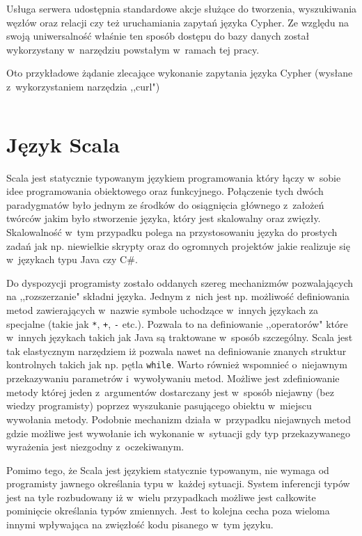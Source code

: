 \documentclass[brudnopis]{xmgr}
\begin{document}
Usługa serwera udostępnia standardowe akcje służące do tworzenia, wyszukiwania węzłów oraz relacji czy też uruchamiania zapytań języka Cypher. Ze względu na swoją uniwersalność właśnie ten sposób dostępu do bazy danych został wykorzystany w~narzędziu powstałym w~ramach tej pracy.

Oto przykładowe żądanie zlecające wykonanie zapytania języka Cypher (wysłane z~wykorzystaniem narzędzia ,,curl")

\inputminted{bash}{listings/bash/neo4j-rest-cypher.sh}

\chapter{Język Scala}

Scala jest statycznie typowanym językiem programowania który łączy w~sobie idee programowania obiektowego oraz funkcyjnego. Połączenie tych dwóch paradygmatów było jednym ze środków do osiągnięcia głównego z~założeń twórców jakim było stworzenie języka, który jest skalowalny oraz zwięzły. Skalowalność w~tym przypadku polega na przystosowaniu języka do prostych zadań jak np. niewielkie skrypty oraz do ogromnych projektów jakie realizuje się w~językach typu Java czy C\#.

Do dyspozycji programisty zostało oddanych szereg mechanizmów pozwalających na ,,rozszerzanie" składni języka. Jednym z~nich jest np. możliwość definiowania metod zawierających w~nazwie symbole uchodzące w~innych językach za specjalne (takie jak \texttt{*}, \texttt{+}, \texttt{-} etc.). Pozwala to na definiowanie ,,operatorów" które w~innych językach takich jak Java są traktowane w~sposób szczególny. Scala jest tak elastycznym narzędziem iż pozwala nawet na definiowanie znanych struktur kontrolnych takich jak np. pętla \texttt{while}. Warto również wspomnieć o~niejawnym przekazywaniu parametrów i~wywoływaniu metod. Możliwe jest zdefiniowanie metody której jeden z~argumentów dostarczany jest w~sposób niejawny (bez wiedzy programisty) poprzez wyszukanie pasującego obiektu w~miejscu wywołania metody. Podobnie mechanizm działa w~przypadku niejawnych metod gdzie możliwe jest wywołanie ich wykonanie w~sytuacji gdy typ przekazywanego wyrażenia jest niezgodny z~oczekiwanym.

Pomimo tego, że Scala jest językiem statycznie typowanym, nie wymaga od programisty jawnego określania typu w~każdej sytuacji. System inferencji typów jest na tyle rozbudowany iż w~wielu przypadkach możliwe jest całkowite pominięcie określania typów zmiennych. Jest to kolejna cecha poza wieloma innymi wpływająca na zwięzłość kodu pisanego w~tym języku.
\end{document}
